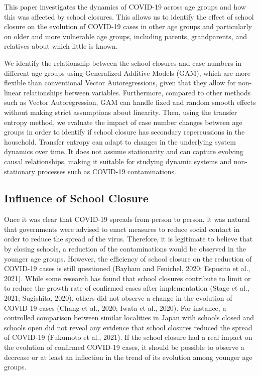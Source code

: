 \documentclass[unnumsec,webpdf,contemporary,large]{oup-authoring-template}%
\theoremstyle{thmstyleone}%
\theoremstyle{thmstyletwo}%
\theoremstyle{thmstylethree}%
\begin{document}
This paper investigates the dynamics of COVID-19 across age groups and how this was affected by school closures. This allows us to identify the effect of school closure on the evolution of COVID-19 cases in other age groups and particularly on older and more vulnerable age groups, including parents, grandparents, and relatives about which little is known.

We identify the relationship between the school closures and case numbers in different age groups using Generalized Additive Models (GAM), which are more flexible than conventional Vector Autoregressions, given that they allow for non-linear relationships between variables. Furthermore, compared to other methods such as Vector Autoregression, GAM can handle fixed and random smooth effects without making strict assumptions about linearity. Then, using the transfer entropy method, we evaluate the impact of case number changes between age groups in order to identify if school closure has secondary repercussions in the household. Transfer entropy can adapt to changes in the underlying system dynamics over time. It does not assume stationarity and can capture evolving causal relationships, making it suitable for studying dynamic systems and non-stationary processes such as COVID-19 contaminations.

\hypertarget{influence-of-school-closure}{%
\subsection{Influence of School Closure}\label{influence-of-school-closure}}

Once it was clear that COVID-19 spreads from person to person, it was natural that governments were advised to enact measures to reduce social contact in order to reduce the spread of the virus. Therefore, it is legitimate to believe that by closing schools, a reduction of the contaminations would be observed in the younger age groups. However, the efficiency of school closure on the reduction of COVID-19 cases is still questioned (Bayham and Fenichel, 2020; Esposito et al., 2021). While some research has found that school closures contribute to limit or to reduce the growth rate of confirmed cases after implementation (Stage et al., 2021; Sugishita, 2020), others did not observe a change in the evolution of COVID-19 cases (Chang et al., 2020; Iwata et al., 2020). For instance, a controlled comparison between similar localities in Japan with schools closed and schools open did not reveal any evidence that school closures reduced the spread of COVID-19 (Fukumoto et al., 2021). If the school closure had a real impact on the evolution of confirmed COVID-19 cases, it should be possible to observe a decrease or at least an inflection in the trend of its evolution among younger age groups.
\end{document}
